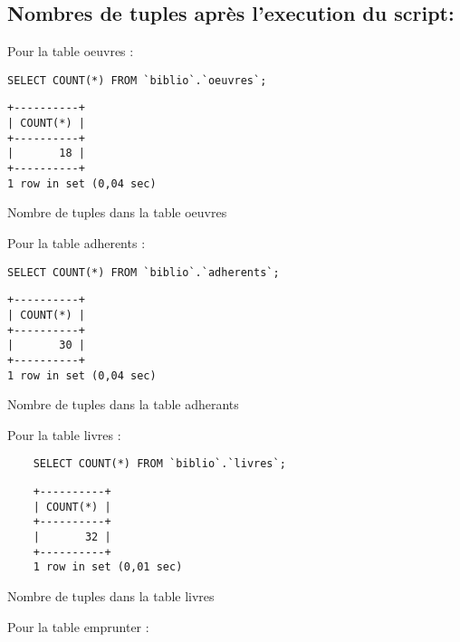 \documentclass{article}
\begin{document}
\subsection{Nombres de tuples après l'execution du script:}
Pour la table oeuvres :

\begin{listing}[H]
	\begin{verbatim}
SELECT COUNT(*) FROM `biblio`.`oeuvres`;
\end{verbatim}

	\begin{verbatim}
+----------+
| COUNT(*) |
+----------+
|       18 |
+----------+
1 row in set (0,04 sec)
\end{verbatim}
	\caption{Nombre de tuples dans la table oeuvres}
\end{listing}

Pour la table adherents :
\begin{listing}[H]
	\begin{verbatim}
SELECT COUNT(*) FROM `biblio`.`adherents`;
\end{verbatim}
	\begin{verbatim}
+----------+
| COUNT(*) |
+----------+
|       30 |
+----------+
1 row in set (0,04 sec)
\end{verbatim}
	\caption{Nombre de tuples dans la table adherants}
\end{listing}

Pour la table livres :
\begin{listing}[H]
	\begin{verbatim}
	SELECT COUNT(*) FROM `biblio`.`livres`;
	\end{verbatim}
	\begin{verbatim}
	+----------+
	| COUNT(*) |
	+----------+
	|       32 |
	+----------+
	1 row in set (0,01 sec)
	\end{verbatim}
	\caption{Nombre de tuples dans la table livres}
\end{listing}
Pour la table emprunter :
\end{document}
